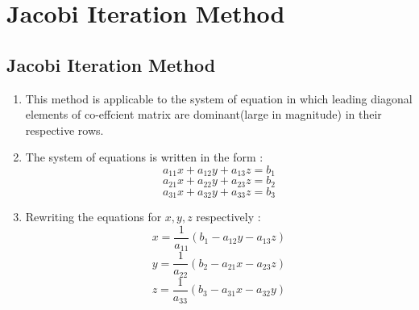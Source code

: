 \newpage
\chapter{Jacobi Iteration Method}



\section{Jacobi Iteration Method}

\begin{enumerate}

  \item This method is applicable to the system of equation in which leading diagonal elements of co-effcient matrix are dominant(large in magnitude) in their respective rows.

  \item The system of equations is written in the form :
  \begin{equation*}
    a_{11}x + a_{12}y + a_{13}z = b_1
  \end{equation*}
  \begin{equation*}
    a_{21}x + a_{22}y + a_{23}z = b_2
  \end{equation*}
  \begin{equation*}
    a_{31}x + a_{32}y + a_{33}z = b_3
  \end{equation*}


  \item Rewriting the equations for $x, y, z$ respectively :
  \begin{equation*}
    x = \frac{1}{a_{11}}(b_1 - a_{12}y - a_{13}z)
  \end{equation*}
  \begin{equation*}
    y = \frac{1}{a_{22}}(b_2 - a_{21}x - a_{23}z)
  \end{equation*}
  \begin{equation*}
    z = \frac{1}{a_{33}}(b_3 - a_{31}x - a_{32}y)
  \end{equation*}


\end{enumerate}
